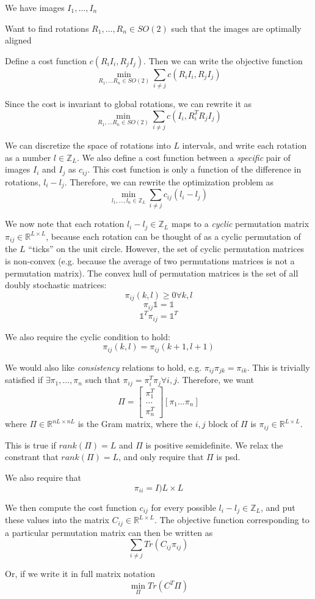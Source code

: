 \documentclass[12pt]{article}
\begin{document}
We have images $I_1, \dots, I_n$

Want to find rotations $R_1, \dots, R_n \in SO(2)$ such that the images are optimally aligned

Define a cost function $c(R_i I_i, R_j I_j)$.
%
Then we can write the objective function 
$$\min_{R_1, \dots R_n \in SO(2)} \sum_{i \ne j} c(R_i I_i, R_j I_j)$$

Since the cost is invariant to global rotations, we can rewrite it as
$$\min_{R_1, \dots R_n \in SO(2)} \sum_{i \ne j} c(I_i, R_i^T R_j I_j)$$

We can discretize the space of rotations into $L$ intervals, and write each rotation as a number $l \in \mathbb{Z}_L$. 
%
We also define a cost function between a {\em specific} pair of images $I_i$ and $I_j$ as $c_{ij}$. 
%
This cost function is only a function of the difference in rotations, $l_i - l_j$. 
%
Therefore, we can rewrite the optimization problem as
$$\min_{l_1, \dots, l_n \in \mathbb{Z}_L} \sum_{i \ne j} c_{ij} (l_i - l_j)$$

We now note that each rotation $l_i-l_j \in \mathbb{Z}_L$ maps to a {\em cyclic} permutation matrix $\pi_{ij} \in \mathbb{R}^{L \times L}$, because each rotation can be thought of as a cyclic permutation of the $L$ ``ticks'' on the unit circle.
%
However, the set of cyclic permutation matrices is non-convex (e.g. because the average of two permutations matrices is not a permutation matrix). 
%
The convex hull of permutation matrices is the set of all doubly stochastic matrices:
$$\pi_{ij}(k,l) \ge 0  \forall k, l $$
$$\pi_{ij} \mathbb{1} = \mathbb{1}$$
$$\mathbb{1}^T \pi_{ij} = \mathbb{1}^T$$

We also require the cyclic condition to hold:
$$\pi_{ij}(k,l) = \pi_{ij}(k+1, l+1)$$

We would also like {\em consistency} relations to hold, e.g. $\pi_{ij} \pi_{jk} = \pi_{ik}$.
%
This is trivially satisfied if $\exists \pi_1, \dots, \pi_n$ such that $\pi_{ij} = \pi_i^T \pi_j \forall i, j$. 
%
Therefore, we want
$$\Pi = \left[ \begin{array}{c} \pi_1^T \\ \dots \\ \pi_n^T \end{array} \right] [\pi_1 \dots \pi_n]$$
where $\Pi \in \mathbb{R}^{nL \times nL}$ is the Gram matrix, where the $i,j$ block of $\Pi$ is $\pi_{ij} \in \mathbb{R}^{L \times L}$.

This is true if $rank(\Pi) = L$ and $\Pi$ is positive semidefinite. 
%
We relax the constrant that $rank(\Pi) = L$, and only require that $\Pi$ is psd. 

We also require that
$$\pi_{ii} = I){L \times L}$$

We then compute the cost function $c_{ij}$ for every possible $l_i - l_j \in \mathbb{Z}_L$, and put these values into the matrix $C_{ij} \in \mathbb{R}^{L \times L}$.
%
The objective function corresponding to a particular permutation matrix can then be written as 
$$\sum_{i \ne j} Tr(C_{ij} \pi_{ij})$$

Or, if we write it in full matrix notation
$$\min_{\Pi} Tr(C^T \Pi)$$
\end{document}
